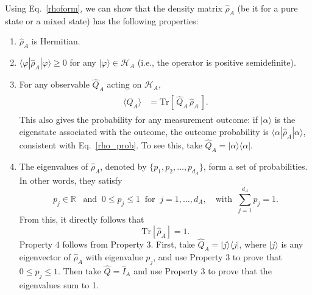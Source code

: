 \documentclass[prx,12pt]{revtex4-2}
\begin{document}
Using Eq.~\eqref{rhoform}, we can show that the density matrix
$\hat{\rho}_A$ (be it for a pure state or a mixed state) has the
following properties:
\begin{enumerate}
\item $\hat{\rho}_A$ is Hermitian.

\item $\langle\varphi|\hat{\rho}_A|\varphi\rangle \ge 0$ for any
  $|\varphi\rangle \in \mathscr{H}_A$ (i.e., the operator is positive
  semidefinite).

\item For any observable $\hat{Q}_A$ acting on $\mathscr{H}_A$,
  \begin{align}
    \begin{aligned}
      \langle Q_A \rangle
      &= \mathrm{Tr}\left[\,\hat{Q}_A \,\hat{\rho}_A\,\right].
    \end{aligned}
    \label{prop3}
  \end{align}
  This also gives the probability for any measurement outcome: if
  $|\alpha\rangle$ is the eigenstate associated with the outcome, the
  outcome probability is $\langle\alpha|\hat\rho_A|\alpha\rangle$,
  consistent with Eq.~\eqref{rho_prob}.  To see this, take $\hat{Q}_A
  = |\alpha\rangle \langle \alpha|$.
  
\item The eigenvalues of $\hat{\rho}_A$, denoted by $\{p_1, p_2,
  \dots, p_{d_A}\}$, form a set of probabilities.  In other words,
  they satisfy
  \begin{equation}
    p_j \in \mathbb{R} \;\;\;\mathrm{and}\;\; 0 \le p_j \le 1 \;\;
    \mathrm{for}\;\; j = 1,\dots,d_A,
    \quad\mathrm{with}\;\; \sum_{j=1}^{d_A} p_j = 1.
    \label{trrho_reduced}    
  \end{equation}
  From this, it directly follows that
  \begin{equation}
    \mathrm{Tr}[\hat\rho_A] = 1.
  \end{equation}
  Property 4 follows from Property 3.  First, take $\hat{Q}_A =
  |j\rangle\langle j|$, where $|j\rangle$ is any eigenvector of
  $\hat\rho_A$ with eigenvalue $p_j$, and use Property 3 to prove that
  $0 \le p_j \le 1$.  Then take $\hat{Q} = \hat{I}_A$ and use Property
  3 to prove that the eigenvalues sum to 1.
\end{enumerate}
\end{document}
